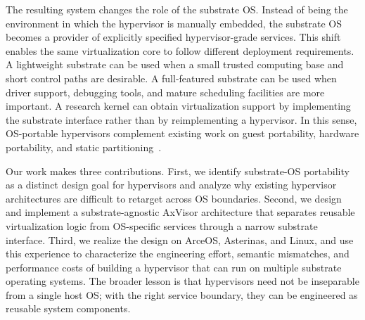 The resulting system changes the role of the substrate OS. Instead of being the environment in which the hypervisor is manually embedded, the substrate OS becomes a provider of explicitly specified hypervisor-grade services. This shift enables the same virtualization core to follow different deployment requirements. A lightweight substrate can be used when a small trusted computing base and short control paths are desirable. A full-featured substrate can be used when driver support, debugging tools, and mature scheduling facilities are more important. A research kernel can obtain virtualization support by implementing the substrate interface rather than by reimplementing a hypervisor. In this sense, OS-portable hypervisors complement existing work on guest portability, hardware portability, and static partitioning~\cite{martins2020lightweight,martins2023shedding,peixoto2024birtio}.

Our work makes three contributions. First, we identify substrate-OS portability as a distinct design goal for hypervisors and analyze why existing hypervisor architectures are difficult to retarget across OS boundaries. Second, we design and implement a substrate-agnostic AxVisor architecture that separates reusable virtualization logic from OS-specific services through a narrow substrate interface. Third, we realize the design on ArceOS, Asterinas, and Linux, and use this experience to characterize the engineering effort, semantic mismatches, and performance costs of building a hypervisor that can run on multiple substrate operating systems. The broader lesson is that hypervisors need not be inseparable from a single host OS; with the right service boundary, they can be engineered as reusable system components.